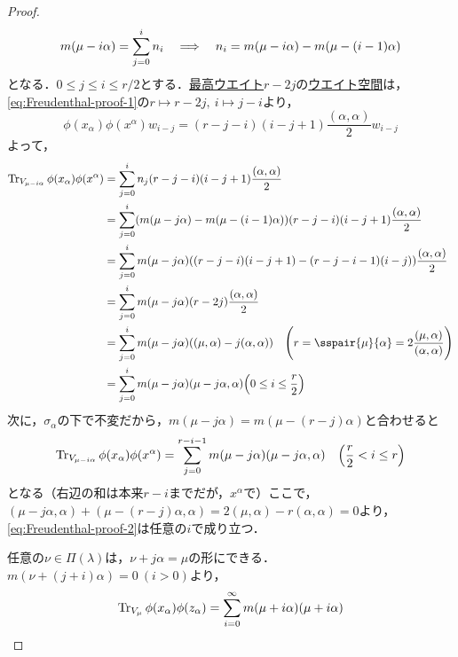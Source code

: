 \documentclass[rep_main]{subfiles}
\begin{document}
\begin{proof}
	\begin{equation}
		m(\mu - i\alpha) = \sum_{j = 0}^i n_i  \quad \Longrightarrow \quad  n_i = m(\mu - i\alpha) - m(\mu - (i - 1)\alpha)
	\end{equation}
	となる．$0 \leq j \leq i \leq r/2$とする．\hyperref[def:highest-weight-module]{最高ウエイト}$r - 2j$の\hyperref[def:weight-rep]{ウエイト空間}は，\eqref{eq:Freudenthal-proof-1}の$r \mapsto r - 2j,\ i \mapsto j - i$より，
	\begin{equation}
		\phi(x_\alpha)\phi(x^\alpha)w_{i - j} = (r - j - i)(i - j + 1)\frac{(\alpha, \alpha)}{2}w_{i - j}
	\end{equation}
	よって，
	\begin{align}
		\Tr_{V_{\mu - i\alpha}} \phi(x_\alpha)\phi(x^\alpha) &= \sum_{j = 0}^i n_j(r - j - i)(i - j + 1)\frac{(\alpha, \alpha)}{2} \\
		&= \sum_{j = 0}^i (m(\mu - j\alpha) - m(\mu - (i - 1)\alpha))(r - j - i)(i - j + 1)\frac{(\alpha, \alpha)}{2} \\
		&= \sum_{j = 0}^i m(\mu - j\alpha)((r - j - i)(i - j + 1) - (r - j - i - 1)(i - j))\frac{(\alpha, \alpha)}{2} \\
		&= \sum_{j = 0}^i m(\mu - j\alpha)(r - 2j)\frac{(\alpha, \alpha)}{2} \\
		&= \sum_{j = 0}^i m(\mu - j\alpha)((\mu, \alpha) - j(\alpha, \alpha))\quad  \Biggl(r = \sspair{\mu}{\alpha} = 2\frac{(\mu, \alpha)}{(\alpha, \alpha)}\Biggr) \\
		\label{eq:Freudenthal-proof-2}
		&= \sum_{j=0}^i m(\mu - j\alpha)(\mu - j\alpha, \alpha)  \Bigl(0 \leq i \leq \frac{r}{2}\Bigr)
	\end{align}
	次に，$\sigma_\alpha$の下で不変だから，$m(\mu - j\alpha) = m(\mu - (r - j)\alpha)$と合わせると
	\begin{equation}
		\Tr_{V_{\mu - i\alpha}} \phi(x_\alpha)\phi(x^\alpha) = \sum_{j=0}^{r - i - 1} m(\mu - j\alpha)(\mu - j\alpha, \alpha)\quad  \Bigl(\frac{r}{2} < i \leq r\Bigr)
	\end{equation}
	となる（右辺の和は本来$r - i$までだが，$x^\alpha$で）ここで，$(\mu - j\alpha, \alpha) + (\mu - (r-j)\alpha, \alpha) = 2(\mu, \alpha) - r(\alpha, \alpha) = 0$より，\ref{eq:Freudenthal-proof-2}は任意の$i$で成り立つ．
	
	任意の$\nu \in \Pi(\lambda)$は，$\nu + j\alpha = \mu$の形にできる．$m(\nu + (j + i)\alpha) = 0\ (i > 0)$より，
	\begin{equation}
		\Tr_{V_\mu} \phi(x_\alpha)\phi(z_\alpha) = \sum_{i=0}^\infty m(\mu + i\alpha)(\mu + i\alpha)
	\end{equation}
	

\end{proof}
\end{document}
